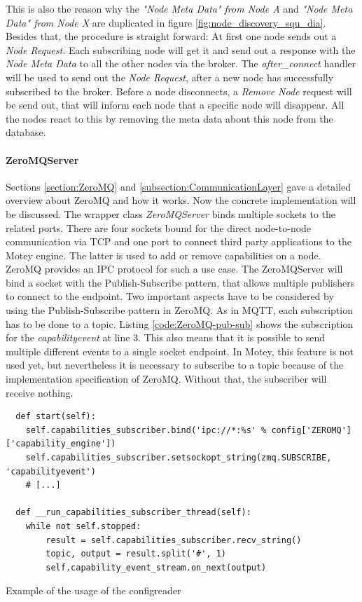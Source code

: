 This is also the reason why the \textit{"Node Meta Data" from Node A} and \textit{"Node Meta Data" from Node X} are duplicated in figure \ref{fig:node_discovery_squ_dia}.
Besides that, the procedure is straight forward: At first one node sends out a \textit{Node Request}.
Each subscribing node will get it and send out a response with the \textit{Node Meta Data} to all the other nodes via the broker.
The \textit{after\_connect} handler will be used to send out the \textit{Node Request}, after a new node has successfully subscribed to the broker.
Before a node disconnects, a \textit{Remove Node} request will be send out, that will inform each node that a specific node will disappear.
All the nodes react to this by removing the meta data about this node from the database.

\paragraph{ZeroMQServer}
Sections \ref{section:ZeroMQ} and \ref{subsection:CommunicationLayer} gave a detailed overview about ZeroMQ and how it works.
Now the concrete implementation will be discussed.
The wrapper class \textit{ZeroMQServer} binds multiple sockets to the related ports.
There are four sockets bound for the direct node-to-node communication via \ac{TCP} and one port to connect third party applications to the Motey engine.
The latter is used to add or remove capabilities on a node.
ZeroMQ provides an \ac{IPC} protocol for such a use case.
The ZeroMQServer will bind a socket with the Publish-Subscribe pattern, that allows multiple publishers to connect to the endpoint.
Two important aspects have to be considered by using the Publish-Subscribe pattern in ZeroMQ.
As in \ac{MQTT}, each subscription has to be done to a topic.
Listing \ref{code:ZeroMQ-pub-sub} shows the subscription for the \textit{capabilityevent} at line 3.
This also means that it is possible to send multiple different events to a single socket endpoint.
In Motey, this feature is not used yet, but nevertheless it is necessary to subscribe to a topic because of the implementation specification of ZeroMQ.
Without that, the subscriber will receive nothing.\newline

\begin{listing}[H]
  \begin{verbatim}
  def start(self):
    self.capabilities_subscriber.bind('ipc://*:%s' % config['ZEROMQ']['capability_engine'])
    self.capabilities_subscriber.setsockopt_string(zmq.SUBSCRIBE, 'capabilityevent')
    # [...]

  def __run_capabilities_subscriber_thread(self):
    while not self.stopped:
        result = self.capabilities_subscriber.recv_string()
        topic, output = result.split('#', 1)
        self.capability_event_stream.on_next(output)
  \end{verbatim}
  \caption{Example of the usage of the configreader}
  \label{code:ZeroMQ-pub-sub}
\end{listing}


